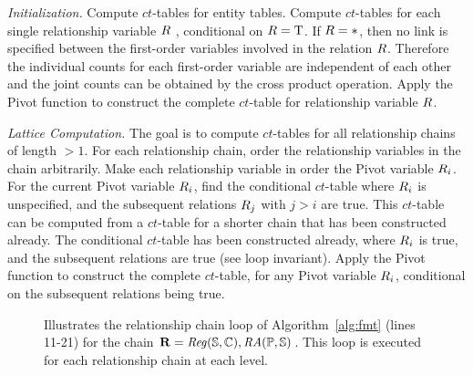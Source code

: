 \documentclass{sig-alternate-2013}
\newcommand{\ct}{\mathit{ct}}
\begin{document}
{\em Initialization.} Compute $\ct$-tables for entity tables.
Compute $\ct$-tables for each single relationship variable $R$ , conditional on $R = \mathrm{T}$. %
If $R = \ast$, then no link is specified between the first-order variables involved in the relation $R$. Therefore the individual counts for each first-order variable are independent of each other and the joint counts can be obtained by the cross product operation. %
Apply the Pivot function to construct the  complete $\ct$-table for relationship variable $R$. %

{\em Lattice Computation.} The goal is to compute $\ct$-tables for all relationship chains of length $>1$. For each relationship chain, order the relationship variables in the chain arbitrarily. Make each relationship variable in order the Pivot variable $R_{i}$. For the current Pivot variable $R_{i}$, find the conditional $\ct$-table where $R_{i}$ is unspecified, and the subsequent relations $R_{j}$ with $j>i$ are true. This $\ct$-table can be computed from a $ct$-table for a shorter chain that has been constructed already. The conditional $ct$-table   has been constructed already, where $R_{i}$ is true, and the subsequent relations are true (see loop invariant). Apply the Pivot function to construct the  complete $\ct$-table, for any Pivot variable $R_{i}$,  conditional on the subsequent relations being true. 
\begin{figure}[htbp]
\begin{center}
\caption{Illustrates the relationship chain loop of Algorithm~\ref{alg:fmt} (lines 11-21) for the chain $\mathbf{R}= \it{Reg}(\mathbb{S},\mathbb{C}),\mathit{RA}(\mathbb{P},\mathbb{S})$. This loop is executed for each relationship chain at each level.
\label{fig:rchain-loop}}
\end{center}
\end{figure}
\end{document}
